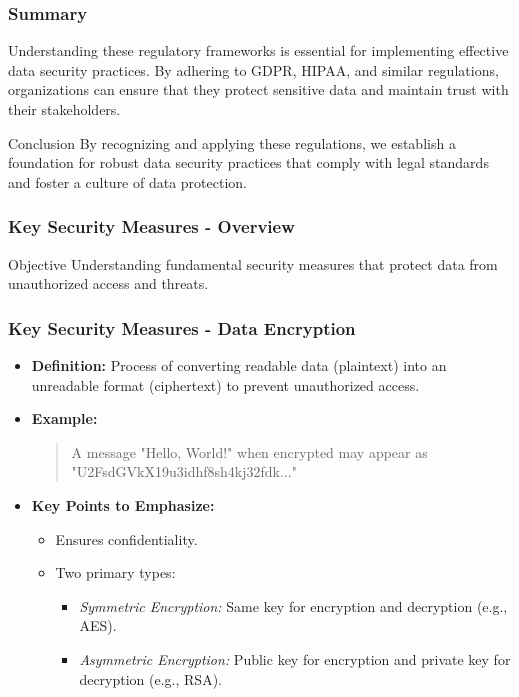 \documentclass{beamer}
\begin{document}
\begin{frame}[fragile]
    \frametitle{Summary}

    Understanding these regulatory frameworks is essential for implementing effective data security practices. By adhering to GDPR, HIPAA, and similar regulations, organizations can ensure that they protect sensitive data and maintain trust with their stakeholders.

    \begin{block}{Conclusion}
        By recognizing and applying these regulations, we establish a foundation for robust data security practices that comply with legal standards and foster a culture of data protection.
    \end{block}
\end{frame}

\begin{frame}[fragile]
    \frametitle{Key Security Measures - Overview}
    \begin{block}{Objective}
        Understanding fundamental security measures that protect data from unauthorized access and threats.
    \end{block}
\end{frame}

\begin{frame}[fragile]
    \frametitle{Key Security Measures - Data Encryption}
    \begin{itemize}
        \item \textbf{Definition:} Process of converting readable data (plaintext) into an unreadable format (ciphertext) to prevent unauthorized access.
        \item \textbf{Example:} 
            \begin{quote}
                A message "Hello, World!" when encrypted may appear as "U2FsdGVkX19u3idhf8sh4kj32fdk..."
            \end{quote}
        \item \textbf{Key Points to Emphasize:}
            \begin{itemize}
                \item Ensures confidentiality.
                \item Two primary types:
                \begin{itemize}
                    \item \textit{Symmetric Encryption:} Same key for encryption and decryption (e.g., AES).
                    \item \textit{Asymmetric Encryption:} Public key for encryption and private key for decryption (e.g., RSA).
                \end{itemize}
            \end{itemize}
    \end{itemize}
\end{frame}
\end{document}
